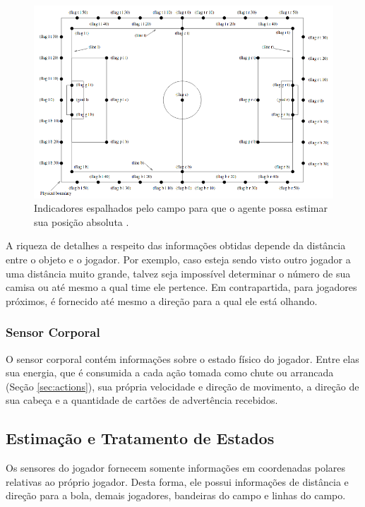 \begin{figure}[H]
	\includegraphics[width=0.9\linewidth]{figs/flags.png}
	\centering
	\caption{Indicadores espalhados pelo campo para que o agente possa estimar sua posição absoluta \cite{rcssmanual2003}.}
	\label{fig:flags}
\end{figure}

A riqueza de detalhes a respeito das informações obtidas depende da distância entre o objeto e o jogador. Por exemplo, caso esteja sendo visto outro jogador a uma distância muito grande, talvez seja impossível determinar o número de sua camisa ou até mesmo a qual time ele pertence. Em contrapartida, para jogadores próximos, é fornecido até mesmo a direção para a qual ele está olhando.

\subsubsection{Sensor Corporal}

O sensor corporal contém informações sobre o estado físico do jogador. Entre elas sua energia, que é consumida a cada ação tomada como chute ou arrancada (Seção \ref{sec:actions}), sua própria velocidade e direção de movimento, a direção de sua cabeça e a quantidade de cartões de advertência recebidos.

\subsection{Estimação e Tratamento de Estados}

\par Os sensores do jogador fornecem somente informações em coordenadas polares relativas ao próprio jogador. Desta forma, ele possui informações de distância e direção para a bola, demais jogadores, bandeiras do campo e linhas do campo.

